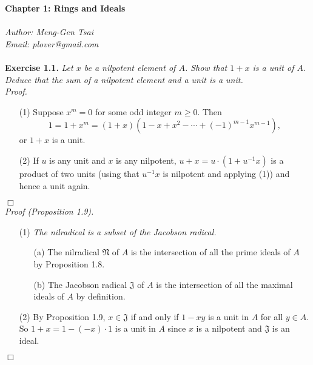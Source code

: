 \documentclass{article}
\begin{document}
\textbf{\Large Chapter 1: Rings and Ideals} \\\\



\emph{Author: Meng-Gen Tsai} \\
\emph{Email: plover@gmail.com} \\\\









\textbf{Exercise 1.1.}
\emph{Let $x$ be a nilpotent element of $A$.
Show that $1+x$ is a unit of $A$.
Deduce that the sum of a nilpotent element and a unit is a unit.} \\

\emph{Proof.}
\begin{enumerate}
\item[(1)]
Suppose $x^m = 0$ for some odd integer $m \geq 0$.
Then
$$1 = 1+x^m = (1+x)(1-x+x^2-\cdots+(-1)^{m-1}x^{m-1}),$$
or $1+x$ is a unit.
\item[(2)]
If $u$ is any unit and $x$ is any nilpotent,
$u + x= u \cdot (1 + u^{-1}x)$ is a product of two units
(using that $u^{-1}x$ is nilpotent and applying (1))
and hence a unit again.
\end{enumerate}
$\Box$ \\

\emph{Proof (Proposition 1.9).}
\begin{enumerate}
\item[(1)]
\emph{The nilradical is a subset of the Jacobson radical.}
\begin{enumerate}
\item[(a)]
The nilradical $\mathfrak{N}$ of $A$ is the intersection of all the prime ideals of $A$
by Proposition 1.8.
\item[(b)]
The Jacobson radical $\mathfrak{J}$ of $A$ is the intersection of all the maximal ideals of $A$
by definition.
\end{enumerate}
\item[(2)]
By Proposition 1.9,
$x \in \mathfrak{J}$ if and only if
$1-xy$ is a unit in $A$ for all $y \in A$.
So $1+x = 1 - (-x) \cdot 1$ is a unit in $A$
since $x$ is a nilpotent and $\mathfrak{J}$ is an ideal.
\end{enumerate}
$\Box$ \\\\
\end{document}
